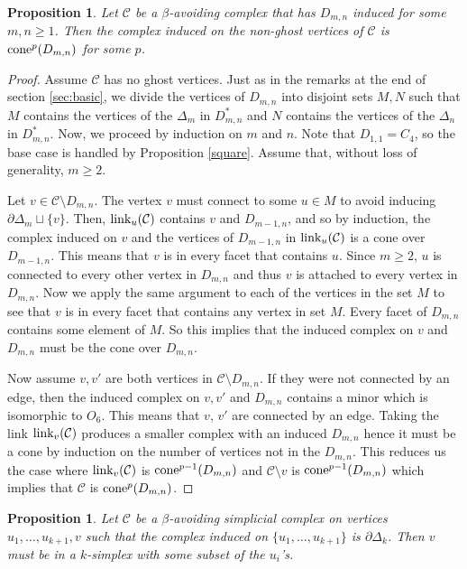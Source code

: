 \documentclass[letterpaper,12pt]{amsart}
\theoremstyle{plain}
\newtheorem{prop}[thm]{Proposition}
\theoremstyle{definition}
\theoremstyle{remark}
\newcommand{\calc}{\mathcal{C}}
\newcommand{\link}{\textnormal{link}}
\newcommand{\cone}{\textnormal{cone}}
\begin{document}
\begin{prop}\label{iteratedcone}
	Let $\mathcal{C}$ be a $\beta$-avoiding complex that has $D_{m,n}$ induced for some $m,n \ge 1$.
	Then the complex induced on the non-ghost vertices of $\mathcal{C}$ is $\cone^p(D_{m,n})$
	for some $p$.
\end{prop}
\begin{proof}
	Assume $\mathcal{C}$ has no ghost vertices.
	Just as in the remarks at the end of section \ref{sec:basic},
	we divide the vertices of $D_{m,n}$ into disjoint sets $M,N$ such that
	$M$ contains the vertices of the $\Delta_m$ in $D_{m,n}^*$ and $N$ contains the vertices of the $\Delta_n$ in $D_{m,n}^*$.
	Now, we proceed by induction on $m$ and $n$.
	Note that $D_{1,1} = C_4$, so the base case is handled by Proposition \ref{square}.
	Assume that, without loss of generality, $m \geq 2$.
	
	Let $v \in \mathcal{C} \setminus D_{m,n}$.
	The vertex $v$ must connect to some $u \in M$ to avoid inducing $\partial\Delta_m \sqcup \{v\}$.
	Then, $\link_u(\calc)$ contains $v$ and $D_{m-1,n}$, and so by induction,
	the complex induced on $v$ and the vertices of $D_{m-1,n}$ in $\link_u(\calc)$ is a cone over $D_{m-1,n}$.
	This means that $v$ is in every facet that contains $u$.
	Since $m \geq 2$,
	$u$ is connected to every other vertex in $D_{m,n}$ and thus
	 $v$ is attached to every vertex in $D_{m,n}$.
	Now we apply the same argument to each of the vertices in the set $M$
	to see that $v$ is in every facet that contains any vertex in set $M$.
	Every facet of $D_{m,n}$ contains some element of $M$.
	So this implies that the induced complex on $v$ and
	$D_{m,n}$ must be the cone over $D_{m,n}$.

	Now assume $v,v'$ are both vertices in $\mathcal{C} \setminus D_{m,n}$.
	If they were not connected by an edge, then the induced complex on $v, v'$ and $D_{m,n}$
	contains a minor which is isomorphic to $O_6$.  This means that
	$v$, $v'$ are connected by an edge.  Taking the link $\link_v(\calc)$ produces
	a smaller complex with an induced $D_{m,n}$ hence it must be a cone
	by induction on the number of vertices not in the $D_{m,n}$.
	This reduces us the case where $\link_v(\calc)$ is $\cone^{p-1}(D_{m,n})$
	and $\calc \setminus v$ is $\cone^{p-1}(D_{m,n})$ which implies that
	$\calc$ is $\cone^p(D_{m,n})$. 
\end{proof}

\begin{prop}\label{ksimplex}
	Let $\mathcal{C}$ be a $\beta$-avoiding simplicial complex on vertices $u_1,\dots,u_{k+1},v$ such
	that the complex induced on $\{u_1,\dots,u_{k+1}\}$ is $\partial\Delta_{k}$.
	Then $v$ must be in a $k$-simplex with some subset of the $u_i$'s.
\end{prop}
\end{document}
